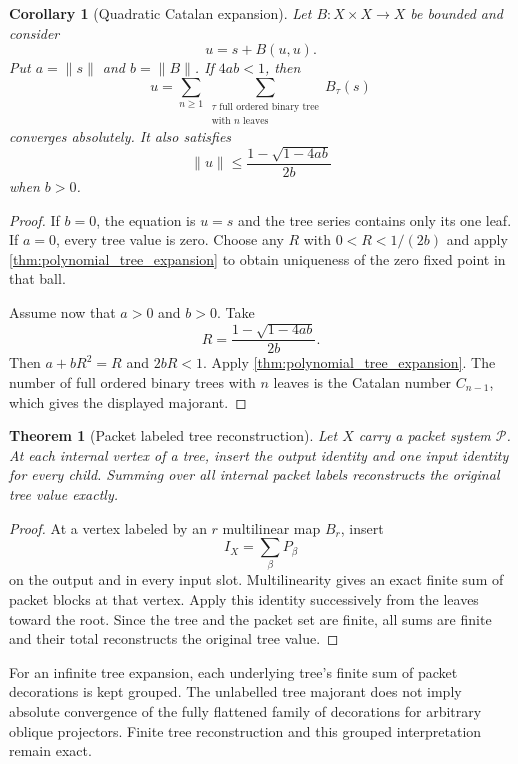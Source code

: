 \documentclass[11pt,a4paper]{article}
\newtheorem{theorem}{Theorem}[section]
\theoremstyle{plain}
\newtheorem{corollary}[corollary]{Corollary}
\theoremstyle{definition}
\theoremstyle{remark}
\newcommand{\Pcal}{\mathcal P}
\begin{document}
\begin{corollary}[Quadratic Catalan expansion]\label{cor:quadratic_tree_expansion}
Let $B:X\times X\to X$ be bounded and consider
\[
u=s+B(u,u).
\]
Put $a=\|s\|$ and $b=\|B\|$.  If $4ab<1$, then
\[
u=
\sum_{n\ge1}
\sum_{\substack{\tau\text{ full ordered binary tree}\\\text{with }n\text{ leaves}}}
B_\tau(s)
\]
converges absolutely.  It also satisfies
\[
\|u\|
\le
\frac{1-\sqrt{1-4ab}}{2b}
\]
when $b>0$.
\end{corollary}

\begin{proof}
If $b=0$, the equation is $u=s$ and the tree series contains only its one leaf.  If $a=0$, every tree value is zero.  Choose any $R$ with $0<R<1/(2b)$ and apply \cref{thm:polynomial_tree_expansion} to obtain uniqueness of the zero fixed point in that ball.

Assume now that $a>0$ and $b>0$.  Take
\[
R=
\frac{1-\sqrt{1-4ab}}{2b}.
\]
Then $a+bR^2=R$ and $2bR<1$.  Apply \cref{thm:polynomial_tree_expansion}.  The number of full ordered binary trees with $n$ leaves is the Catalan number $C_{n-1}$, which gives the displayed majorant.
\end{proof}

\begin{theorem}[Packet labeled tree reconstruction]\label{thm:packet_tree_reconstruction}
Let $X$ carry a packet system $\Pcal$.  At each internal vertex of a tree, insert the output identity and one input identity for every child.  Summing over all internal packet labels reconstructs the original tree value exactly.
\end{theorem}

\begin{proof}
At a vertex labeled by an $r$ multilinear map $B_r$, insert
\[
I_X=\sum_\beta P_\beta
\]
on the output and in every input slot.  Multilinearity gives an exact finite sum of packet blocks at that vertex.  Apply this identity successively from the leaves toward the root.  Since the tree and the packet set are finite, all sums are finite and their total reconstructs the original tree value.
\end{proof}

For an infinite tree expansion, each underlying tree's finite sum of packet decorations is kept grouped. The unlabelled tree majorant does not imply absolute convergence of the fully flattened family of decorations for arbitrary oblique projectors. Finite tree reconstruction and this grouped interpretation remain exact.
\end{document}
